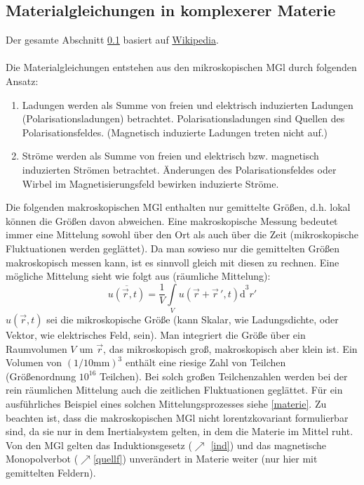 \subsection{Materialgleichungen in komplexerer Materie} \label{mglkommat}
Der gesamte Abschnitt \ref{mglkommat} basiert auf \href{https://de.wikipedia.org/wiki/Materialgleichungen_der_Elektrodynamik}{Wikipedia}.\\\\
 Die Materialgleichungen entstehen aus den mikroskopischen MGl durch folgenden Ansatz:
 \begin{enumerate}
 \item Ladungen werden als Summe von freien und elektrisch induzierten Ladungen (Polarisationsladungen) betrachtet. Polarisationsladungen sind Quellen des Polarisationsfeldes. (Magnetisch induzierte Ladungen treten nicht auf.)
 \item Ströme werden als Summe von freien und elektrisch bzw. magnetisch induzierten Strömen betrachtet. Änderungen des Polarisationsfeldes oder Wirbel im Magnetisierungsfeld bewirken induzierte Ströme.
 \end{enumerate}
 Die folgenden makroskopischen MGl enthalten nur gemittelte Größen, d.h. lokal können die Größen davon abweichen. Eine makroskopische Messung bedeutet immer eine Mittelung sowohl über den Ort als auch über die Zeit (mikroskopische Fluktuationen werden geglättet). Da man sowieso nur die gemittelten Größen makroskopisch messen kann, ist es sinnvoll gleich mit diesen zu rechnen. Eine mögliche Mittelung sieht wie folgt aus (räumliche Mittelung):
\begin{equation}\overline{u\left( \vec{r},t \right)}=\frac{1}{V}\int\limits_{V}{u\left( \vec{r}+\vec{r}\,',t \right)\mathrm{d}}^3r'\end{equation}
 $u\left( \vec{r},t \right)$ sei die mikroskopische Größe (kann Skalar, wie Ladungsdichte, oder Vektor, wie elektrisches Feld, sein). Man integriert die Größe über ein Raumvolumen $V$ um $\vec{r}$, das mikroskopisch groß, makroskopisch aber klein ist. Ein Volumen von $(1/10\mathrm{mm})^3$ enthält eine riesige Zahl von Teilchen (Größenordnung $10^{16}$ Teilchen). Bei solch großen Teilchenzahlen werden bei der rein räumlichen Mittelung auch die zeitlichen Fluktuationen geglättet. Für ein ausführliches Beispiel eines solchen Mittelungsprozesses siehe \ref{materie}. Zu beachten ist, dass die makroskopischen MGl nicht lorentzkovariant formulierbar sind, da sie nur in dem Inertialsystem gelten, in dem die Materie im Mittel ruht. Von den MGl gelten das Induktionsgesetz ($\nearrow$ \ref{ind}) und das magnetische Monopolverbot ($\nearrow$\ref{quellf}) unverändert in Materie weiter (nur hier mit gemittelten Feldern).

